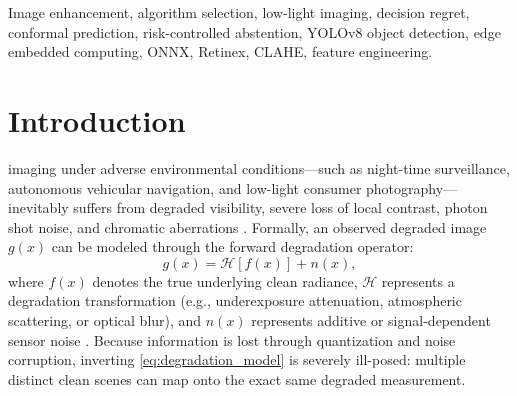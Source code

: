 \documentclass[journal]{IEEEtran}
\begin{document}
\begin{abstract}
abstention, which elevates top-1 accuracy to $70.59\%$ and suppresses regret to $1.068\text{ dB}$ on accepted frames. Investigating dual-metric fidelity (RQ2), we show that PSNR and SSIM oracles align in $63.30\%$ of scenes with a mean ranking correlation of $\rho = 0.8823$. Cross-dataset zero-shot transfer demonstrates that our selector outperforms the best fixed baseline by $+2.015\text{ dB}$ on LOL-v2 Synthetic (closing $38.7\%$ of the regret gap) and defaults stably on real camera sensor shifts ($d = 0.0000\text{ dB}$). Finally, leave-one-enhancer-out (LOEO) analysis identifies Retinex (+1.090 dB impact), Histogram Equalization (+0.807 dB), and Gamma (+0.210 dB) as the Pareto core of the enhancement bank, while an expanded 10-dimensional physical feature set confirms that the 8-D baseline is parsimonious and near-optimal ($d = -0.0184\text{ dB}$, $p = 0.5481$). Crucially, downstream vision evaluations confirm practical utility: on an end-to-end YOLOv8 object detection benchmark across unseen nocturnal scenes, our selector attains $67.15\%$ detection recall compared to only $48.53\%$ for the static Retinex baseline, which severely degrades detection due to noise-induced edge artifacts.
\end{abstract}

\begin{IEEEkeywords}
Image enhancement, algorithm selection, low-light imaging, decision regret, conformal prediction, risk-controlled abstention, YOLOv8 object detection, edge embedded computing, ONNX, Retinex, CLAHE, feature engineering.
\end{IEEEkeywords}

\section{Introduction}
 imaging under adverse environmental conditions—such as night-time surveillance, autonomous vehicular navigation, and low-light consumer photography—inevitably suffers from degraded visibility, severe loss of local contrast, photon shot noise, and chromatic aberrations \cite{zheng2024lowlight, wei2018deep}. Formally, an observed degraded image $g(x)$ can be modeled through the forward degradation operator:
\begin{equation}
g(x) = \mathcal{H}[f(x)] + n(x),
\label{eq:degradation_model}
\end{equation}
where $f(x)$ denotes the true underlying clean radiance, $\mathcal{H}$ represents a degradation transformation (e.g., underexposure attenuation, atmospheric scattering, or optical blur), and $n(x)$ represents additive or signal-dependent sensor noise \cite{chen2018learning}. Because information is lost through quantization and noise corruption, inverting \eqref{eq:degradation_model} is severely ill-posed: multiple distinct clean scenes can map onto the exact same degraded measurement.
\end{document}
